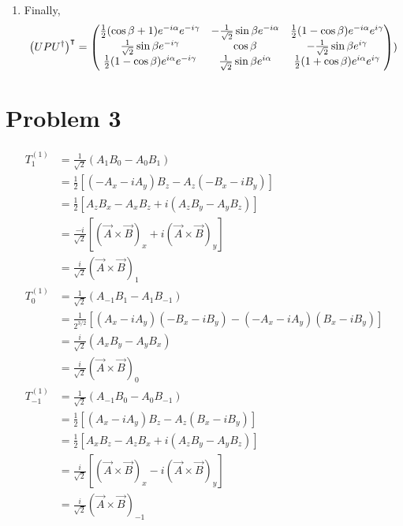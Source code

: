 \documentclass[12pt]{article}
\begin{document}
\begin{enumerate}[label=(\alph*)]
    \item Finally,
    \[ \left(UPU^\dag\right)^\intercal = \mqty(\frac{1}{2}(\cos\beta + 1)e^{-i\alpha}e^{-i\gamma} & -\frac{1}{\sqrt{2}}\sin\beta e^{-i\alpha} & \frac{1}{2}(1 - \cos\beta)e^{-i\alpha}e^{i\gamma} \\ \frac{1}{\sqrt{2}}\sin\beta e^{-i\gamma} & \cos\beta & -\frac{1}{\sqrt{2}}\sin\beta e^{i\gamma} \\ \frac{1}{2}(1 - \cos\beta)e^{i\alpha}e^{-i\gamma} & \frac{1}{\sqrt{2}}\sin\beta e^{i\alpha} & \frac{1}{2}(1 + \cos\beta)e^{i\alpha}e^{i\gamma}) )  \]

\end{enumerate}


\section*{Problem 3}
\begin{align*}
    T_1^{(1)}    &= \frac{1}{\sqrt{2}}\left(A_1B_0 - A_0B_1\right) \\
                 &= \frac{1}{2}\left[\left(-A_x-iA_y\right)B_z - A_z\left(-B_x-iB_y\right)\right] \\
                 &= \frac{1}{2} \left[A_zB_x - A_xB_z + i\left(A_zB_y - A_yB_z\right)\right] \\
                 &= \frac{-i}{\sqrt{2}}\left[\left(\vec{A}\times\vec{B}\right)_x + i\left(\vec{A}\times\vec{B}\right)_y\right]  \\
                 &= \frac{i}{\sqrt{2}}\left(\vec{A}\times\vec{B}\right)_1 \\
    T_0^{(1)}    &= \frac{1}{\sqrt{2}}\left(A_{-1}B_1 - A_1B_{-1}\right) \\
                 &= \frac{1}{2^{3/2}}\left[\left(A_x - iA_y\right)\left(-B_x -iB_y\right) - \left(-A_x - iA_y\right)\left(B_x - iB_y\right)\right] \\
                 &= \frac{i}{\sqrt{2}}\left(A_xB_y - A_yB_x\right) \\
                 &= \frac{i}{\sqrt{2}}\left(\vec{A}\times\vec{B}\right)_0 \\
    T_{-1}^{(1)} &= \frac{1}{\sqrt{2}}\left(A_{-1}B_0 - A_0B_{-1}\right) \\
                 &= \frac{1}{2}\left[\left(A_x-iA_y\right)B_z - A_z\left(B_x-iB_y\right)\right] \\
                 &= \frac{1}{2}\left[A_xB_z - A_zB_x + i\left(A_zB_y - A_yB_z\right)\right] \\
                 &= \frac{i}{\sqrt{2}}\left[\left(\vec{A}\times\vec{B}\right)_x - i\left(\vec{A}\times\vec{B}\right)_y\right] \\
                 &= \frac{i}{\sqrt{2}}\left(\vec{A}\times\vec{B}\right)_{-1}
\end{align*}
\end{document}
